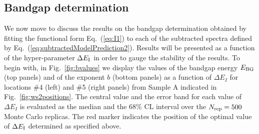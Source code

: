 \subsection{Bandgap determination}

We now move to discuss the results on the bandgap determination obtained
by fitting the functional form Eq.~(\ref{eq:I1}) to each of the subtracted
spectra defined by Eq.~(\ref{eq:subtractedModelPrediction2}).
%
Results will be presented as a function of the hyper-parameter $\Delta E_{\rm I}$
in order to gauge the stability of the results.
%
To begin with, in Fig.~\ref{fig:bvalues}
we display the values of the bandgap energy $E_{\rm BG}$ (top panels)
and of the exponent $b$ (bottom panels) as a function of $\Delta E_I$
for locations \#4 (left)
and \#5 (right panels) from Sample A indicated in Fig.~\ref{fig:ws2positions}.
%
The central value and the error band for each value of $\Delta E_I$ is evaluated
as the median and the 68\% CL interval over the $N_{\rm rep}=500$ Monte Carlo replicas.
%
The red marker indicates the position of the optimal value of
$\Delta E_{\rm I}$ determined as specified above.

